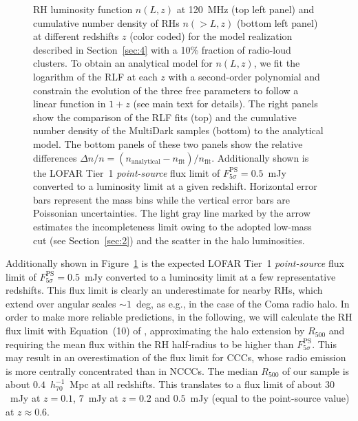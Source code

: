 \documentclass[traditabstract]{aa}
\newcommand{\rmn}{\mathrm}
\begin{document}
\begin{figure}[t]
\caption{RH luminosity function $n(L,z)$ at 120~MHz (top left panel) and cumulative
  number density of RHs  $n(>L,z)$ (bottom left panel) at different redshifts $z$ (color
  coded) for the model realization described in Section~\ref{sec:4} with a 10\%
  fraction of radio-loud clusters. To obtain an analytical model for $n(L,z)$,
  we fit the logarithm of the RLF at each $z$ with a second-order polynomial and
  constrain the evolution of the three free parameters to follow a linear
  function in $1+z$ (see main text for details). The right panels show the
  comparison of the RLF fits (top) and the cumulative number density of the
  MultiDark samples (bottom) to the analytical model. The bottom panels of these
  two panels show the relative differences $\Delta n / n =
  (n_{\rmn{analytical}} - n_{\rmn{fit}})/n_{\rmn{fit}}$. Additionally shown is
  the LOFAR Tier~1 \emph{point-source} flux limit of
  $F_{5\sigma}^{\rmn{PS}}=0.5$~mJy \citep{2012JApA..tmp...34R} converted to a
  luminosity limit at a given redshift. Horizontal error bars represent the mass
  bins while the vertical error bars are Poissonian uncertainties.  The light
  gray line marked by the arrow estimates the incompleteness limit owing to the
  adopted low-mass cut (see Section~\ref{sec:2}) and the scatter in the halo
  luminosities.}
\label{fig:RLF_120}
\end{figure} 

Additionally shown in Figure~\ref{fig:RLF_120} is the expected LOFAR Tier~1
\emph{point-source} flux limit of $F_{5\sigma}^{\rmn{PS}}=0.5$~mJy
\citep{2012JApA..tmp...34R} converted to a luminosity limit at a few representative
redshifts. This flux limit is clearly an underestimate for nearby RHs, which
extend over angular scales $\sim1$~deg, as e.g., in the case of the Coma radio
halo. In order to make more reliable predictions, in the following, we will
calculate the RH flux limit with Equation~(10) of \cite{2010A&A...509A..68C},
approximating the halo extension by $R_{500}$ and requiring the mean flux within
the RH half-radius to be higher than $F_{5\sigma}^{\rmn{PS}}$. This may result
in an overestimation of the flux limit for CCCs, whose radio emission is more
centrally concentrated than in NCCCs. The median $R_{500}$ of our sample is
about $0.4$~$h_{70}^{-1}$~Mpc at all redshifts. This translates to a flux limit
of about $30$~mJy at $z = 0.1$, $7$~mJy at $z = 0.2$ and $0.5$~mJy (equal to the
point-source value) at $z \approx 0.6$.
\end{document}
